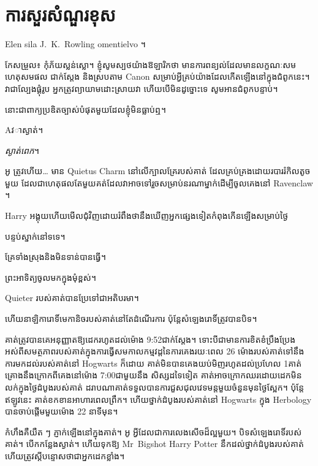 \chapter{ការសួរសំណួរខុស}

\begin{chapterOpeningAuthorNote}
Elen sila J.~K.~Rowling omentielvo ។

កែសម្រួល៖ កុំភ័យស្លន់ស្លោ។ ខ្ញុំសូមស្បថយ៉ាងឱឡារិកថា មានការពន្យល់ដែលមានលក្ខណៈសមហេតុសមផល ជាក់ស្តែង និងស្របតាម Canon សម្រាប់អ្វីគ្រប់យ៉ាងដែលកើតឡើងនៅក្នុងជំពូកនេះ។ វា​ជា​ល្បែង​ផ្គុំ​រូប អ្នក​ត្រូវ​ព្យាយាម​ដោះស្រាយ​វា ហើយ​បើ​មិន​ដូច្នោះ​ទេ សូម​អាន​ជំពូក​បន្ទាប់។
\end{chapterOpeningAuthorNote}
\begin{chapterOpeningQuote}
នោះ​ជា​ពាក្យ​ប្រឌិត​ច្បាស់​បំផុត​មួយ​ដែល​ខ្ញុំ​មិន​ធ្លាប់​ឮ។
\end{chapterOpeningQuote}

\lettrine{A}

វាស្ងាត់។

\emph{ស្ងាត់ពេក}។

អូ ត្រូវហើយ… មាន Quietus Charm នៅលើក្បាលគ្រែរបស់គាត់ ដែលគ្រប់គ្រងដោយរបាររំកិលតូចមួយ ដែលជាហេតុផលតែមួយគត់ដែលវាអាចទៅរួចសម្រាប់នរណាម្នាក់ដើម្បីចូលគេងនៅ Ravenclaw ។

Harry អង្គុយហើយមើលជុំវិញដោយរំពឹងថានឹងឃើញអ្នកផ្សេងទៀតកំពុងកើនឡើងសម្រាប់ថ្ងៃ

បន្ទប់ស្នាក់នៅទទេ។

គ្រែ​ទាំង​ស្រុង​និង​មិន​ទាន់​បាន​ធ្វើ។

ព្រះអាទិត្យចូលមកក្នុងមុំខ្ពស់។

Quieter របស់គាត់បានប្រែទៅជាអតិបរមា។

ហើយនាឡិការោទិ៍មេកានិចរបស់គាត់នៅតែដំណើរការ ប៉ុន្តែសំឡេងរោទិ៍ត្រូវបានបិទ។

គាត់ត្រូវបានគេអនុញ្ញាតឱ្យដេករហូតដល់ម៉ោង 9:52\am ជាក់ស្តែង។ ទោះបីជាមានការខិតខំប្រឹងប្រែងអស់ពីសមត្ថភាពរបស់គាត់ក្នុងការធ្វើសមកាលកម្មវដ្តនៃការគេងរយៈពេល 26 ម៉ោងរបស់គាត់ទៅនឹងការមកដល់របស់គាត់នៅ Hogwarts ក៏ដោយ គាត់មិនបានគេងយប់មិញរហូតដល់ប្រហែល 1\am គាត់គ្រោងនឹងក្រោកពីគេងនៅម៉ោង 7:00\am ជាមួយនឹង សិស្សដទៃទៀត គាត់អាចក្រោកឈរដោយដេកមិនលក់ក្នុងថ្ងៃដំបូងរបស់គាត់ ដរាបណាគាត់ទទួលបានការជួសជុលវេទមន្តមួយចំនួនមុនថ្ងៃស្អែក។ ប៉ុន្តែឥឡូវនេះ គាត់ខកខានអាហារពេលព្រឹក។ ហើយថ្នាក់ដំបូងរបស់គាត់នៅ Hogwarts ក្នុង Herbology បានចាប់ផ្តើមមួយម៉ោង 22 នាទីមុន។

កំហឹងគឺយឺត ៗ ភ្ញាក់ឡើងនៅក្នុងគាត់។ អូ អ្វី​ដែល​ជា​ការ​លេងសើច​ដ៏​ល្អ​មួយ​។ បិទសំឡេងរោទិ៍របស់គាត់។ បើកកន្លែងស្ងាត់។ ហើយទុកឱ្យ Mr~Bigshot Harry Potter នឹកដល់ថ្នាក់ដំបូងរបស់គាត់ ហើយត្រូវស្តីបន្ទោសថាជាអ្នកដេកខ្លាំង។

